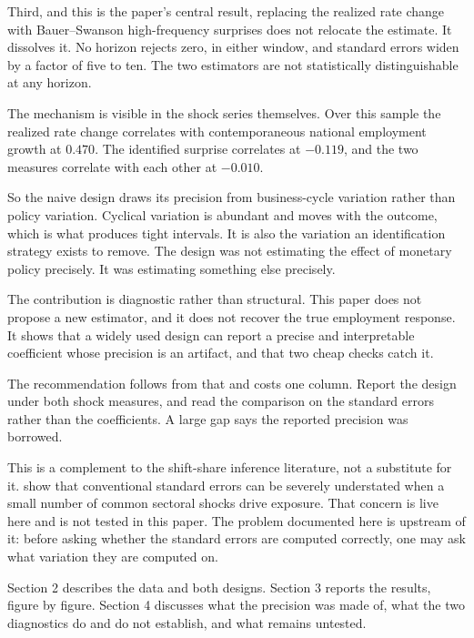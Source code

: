 Third, and this is the paper's central result, replacing the realized rate
change with Bauer--Swanson high-frequency surprises does not relocate the
estimate. It dissolves it. No horizon rejects zero, in either window, and
standard errors widen by a factor of five to ten. The two estimators are not
statistically distinguishable at any horizon.

The mechanism is visible in the shock series themselves. Over this sample the
realized rate change correlates with contemporaneous national employment growth
at $0.470$. The identified surprise correlates at $-0.119$, and the two measures
correlate with each other at $-0.010$.

So the naive design draws its precision from business-cycle variation rather
than policy variation. Cyclical variation is abundant and moves with the
outcome, which is what produces tight intervals. It is also the variation an
identification strategy exists to remove. The design was not estimating the
effect of monetary policy precisely. It was estimating something else precisely.

The contribution is diagnostic rather than structural. This paper does not
propose a new estimator, and it does not recover the true employment response.
It shows that a widely used design can report a precise and interpretable
coefficient whose precision is an artifact, and that two cheap checks catch it.

The recommendation follows from that and costs one column. Report the design
under both shock measures, and read the comparison on the standard errors
rather than the coefficients. A large gap says the reported precision was
borrowed.

This is a complement to the shift-share inference literature, not a substitute
for it. \citet{adao2019} show that conventional standard errors can be severely
understated when a small number of common sectoral shocks drive exposure. That
concern is live here and is not tested in this paper. The problem documented
here is upstream of it: before asking whether the standard errors are computed
correctly, one may ask what variation they are computed on.

Section 2 describes the data and both designs. Section 3 reports the results,
figure by figure. Section 4 discusses what the precision was made of, what the
two diagnostics do and do not establish, and what remains untested.
